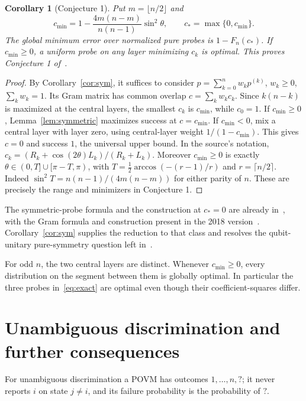 \documentclass[11pt]{article}
\newtheorem{corollary}[theorem]{Corollary}
\begin{document}
\begin{corollary}[Conjecture 1]\label{cor:optimal}
Put $m=\lfloor n/2\rfloor$ and
\[
 c_{\min}=1-\frac{4m(n-m)}{n(n-1)}\sin^2\theta,
 \qquad c_*=\max\{0,c_{\min}\}.
\]
The global minimum error over normalized pure probes is $1-F_n(c_*)$.
If $c_{\min}\geq0$, a uniform probe on any layer minimizing $c_k$ is
optimal. This proves Conjecture 1 of~\cite[Section 5, p.~10:10]{ZGH}.
\end{corollary}
\begin{proof}
By Corollary~\ref{cor:sym}, it suffices to consider
$p=\sum_{k=0}^n w_k p^{(k)}$, $w_k\geq0$, $\sum_k w_k=1$.
Its Gram matrix has common overlap $c=\sum_k w_k c_k$.
Since $k(n-k)$ is maximized at the central layers, the smallest $c_k$
is $c_{\min}$, while $c_0=1$.
If $c_{\min}\geq0$, Lemma~\ref{lem:symmetric} maximizes success at
$c=c_{\min}$. If $c_{\min}<0$, mix a central layer with layer zero,
using central-layer weight $1/(1-c_{\min})$. This gives $c=0$ and
success $1$, the universal upper bound. In the source's notation,
$c_k=(R_k+\cos(2\theta)L_k)/(R_k+L_k)$.
Moreover $c_{\min}\geq0$ is exactly
$\theta\in(0,T]\cup[\pi-T,\pi)$, with
$T=\tfrac12\arccos(- (r-1)/r)$ and $r=\lceil n/2\rceil$.
Indeed $\sin^2T=n(n-1)/(4m(n-m))$ for either parity of $n$.
These are precisely the range and minimizers in Conjecture 1.
\end{proof}

The symmetric-probe formula and the construction at $c_*=0$ are
already in~\cite[Section III.B, Eqs.~(16)--(17)]{SLHCM24}, with the
Gram formula and construction present in the 2018 version~\cite{SHCM18}.
Corollary~\ref{cor:sym} supplies the reduction to that class and resolves
the qubit-unitary pure-symmetry question left in~\cite[Section V]{SLHCM24}.

For odd $n$, the two central layers are distinct. Whenever
$c_{\min}\geq0$, every distribution on the segment between them is
globally optimal. In particular the three probes in~\eqref{eq:exact}
are optimal even though their coefficient-squares differ.

\section{Unambiguous discrimination and further consequences}
For unambiguous discrimination a POVM has outcomes $1,\ldots,n,?$;
it never reports $i$ on state $j\ne i$, and its failure probability
is the probability of $?$.
\end{document}
